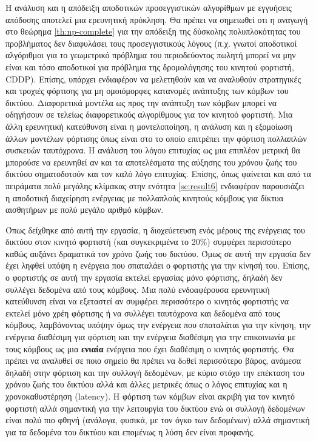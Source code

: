 Η ανάλυση και η απόδειξη αποδοτικών προσεγγιστικών αλγορίθμων με εγγυήσεις απόδοσης αποτελεί μια ερευνητική πρόκληση. Θα πρέπει να σημειωθεί οτι η αναγωγή στο
θεώρημα \ref{th:np-complete} για την απόδειξη της δύσκολης πολυπλοκότητας του προβλήματος δεν διαφυλάσει τους προσεγγιστικούς λόγους (π.χ. γνωτοί αποδοτικοί
αλγόριθμοι για το γεωμετρικό πρόβλημα του περιοδεύοντος πωλητή μπορεί να μην είναι και τόσο αποδοτικοί για πρόβλημα της δρομολόγησης του κινητού φορτιστή, CDDP).
Επίσης, υπάρχει ενδιαφέρον να μελετηθούν και να αναλυθούν στρατηγικές και τροχιές φόρτισης για μη ομοιόμορφες κατανομές ανάπτυξης των κόμβων του δικτύου. Διαφορετικά
μοντέλα ως προς την ανάπτυξη των κόμβων μπορεί να οδηγήσουν σε τελείως διαφορετικούς αλγορίθμους για τον κινητοό φορτιστή. Μια άλλη ερευνητική κατεύθυνση είναι
η μοντελοποίηση, η ανάλυση και η εξομοίωση άλλων μοντέλων φόρτισης όπως είναι στο \cite{multiple_devices} το οποίο επιτρέπει την φόρτιση πολλαπλών συσκευών
ταυτόχρονα. H ανάλυση του λόγου επιτυχίας ως μια επιπλέον μετρική θα μπορούσε να ερευνηθεί αν και τα αποτελέσματα της αύξησης του χρόνου ζωής του δικτύου
σηματοδοτούν και τον καλό λόγο επιτυχίας. Επίσης, όπως φαίνεται και από τα πειράματα πολύ μεγάλης κλίμακας στην ενότητα \ref{sc:result6} ενδιαφέρον παρουσιάζει η
αποδοτική διαχείρηση ενέργειας με πολλαπλούς κινητούς κόμβους για δίκτυα αισθητήρων με πολύ μεγάλο αριθμό κόμβων.


Όπως δείχθηκε από αυτή την εργασία, η διοχεύετευση ενός μέρους της ενέργειας του δικτύου στον κινητό φορτιστή (και συγκεκριμένα το 20\%) συμφέρει περισσότερο καθώς
αυξάνει δραματικά τον χρόνο ζωής του δικτύου. Όμως σε αυτή την εργασία δεν έχει ληφθεί υπόψη η ενέργεια που σπαταλάει ο φορτιστής για την κίνησή του. Επίσης, ο
φορτιστής σε αυτή την εργασία εκτελεί εργασίας μόνο φόρτισης, δηλαδή δεν συλλέγει δεδομένα από τους κόμβους. Μια πολύ ενδοαφέρουσα ερευνητική κατεύθυνση είναι να
εξεταστεί αν συμφέρει περισσότερο ο κινητός φορτιστής να εκτελεί μόνο χρέη φόρτισης ή να συλλέγει ταυτόχρονα και δεδομένα από τους κόμβους, λαμβάνοντας υπόψην όμως
την ενέργεια που σπαταλάται για την κίνηση, την ενέργεια διαθέσιμη για φόρτιση και την ενέργεια διαθέσιμη για την επικοινωνία με τους κόμβους ως μια \textbf{ενιαία}
ενέργεια που έχει διαθέσιμη ο κινητός φορτιστής. Θα πρέπει να αναλυθεί σε ποιο σημείο θα πρέπει να δoθεί περισσότερο βάρος, ανάμεσα δηλαδή στην φόρτιση και την
συλλογή δεδομένων, με κύριο στόχο την επέκταση του χρόνου ζωής του δικτύου αλλά και άλλες μετρικές όπως ο λόγος επιτυχίας και η χρονοκαθυστέρηση (latency). Η φόρτιση
των κόμβων είναι ακριβή για τον κινητό φορτιστή αλλά σημαντική για την λειτουργία του δικτύου ενώ οι συλλογή δεδομένων είναι πολύ πιο φθηνή (ανάλογα, φυσικά, με τον
όγκο των δεδομένων) αλλά σημαντική για τα δεδομένα του δικτύου και επομένως η λύση δεν είναι προφανής.
